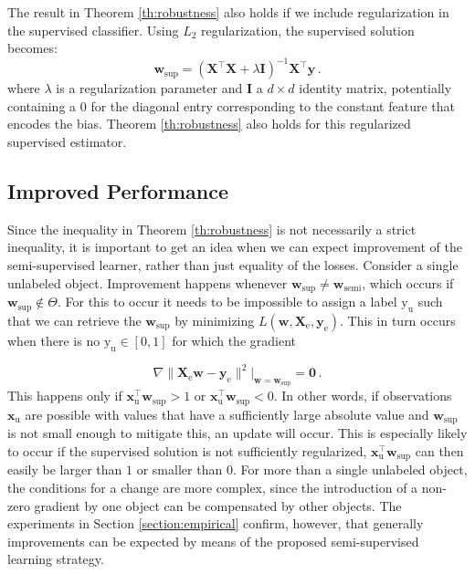 \documentclass[twoside]{memoir}\usepackage[]{graphicx}\usepackage{xcolor}
\renewcommand{\vec}{\mathbf}
\begin{document}
The result in Theorem \ref{th:robustness} also holds if we include regularization in the supervised classifier. Using $L_2$ regularization, the supervised solution becomes:
\begin{equation}
\label{eq:regsupervisedsolution}
\vec{w}_{\text{sup}} = (\vec{X}^\top \vec{X} + \lambda \vec{I})^{-1} \vec{X}^\top \vec{y}\,. \nonumber
\end{equation}
where $\lambda$ is a regularization parameter and $\vec{I}$ a $d \times d$ identity matrix, potentially containing a $0$ for the diagonal entry corresponding to the constant feature that encodes the bias. Theorem \ref{th:robustness} also holds for this regularized supervised estimator.

\subsection{Improved Performance}
Since the inequality in Theorem \ref{th:robustness} is not necessarily a strict inequality, it is important to get an idea when we can expect improvement of the semi-supervised learner, rather than just equality of the losses. Consider a single unlabeled object. Improvement happens whenever $\vec{w}_\text{sup} \neq \vec{w}_\text{semi}$, which occurs if $\vec{w}_\text{sup} \notin \Theta$.  For this to occur it needs to be impossible to assign a label $\text{y}_\text{u}$ such that we can retrieve the $\vec{w}_\text{sup}$ by minimizing $L(\vec{w},\vec{X}_\text{e},\vec{y}_\text{e})$. This in turn occurs when there is no $\text{y}_\text{u} \in [0,1]$ for which the gradient

\begin{equation}
\nabla \lVert \vec{X}_\text{e} \vec{w} - \vec{y}_\text{e} \rVert^2\bigg|_{\vec{w}=\vec{w}_\text{sup}}=\vec{0}  \, . \nonumber
\end{equation}
This happens only if $\vec{x}_\text{u}^\top \vec{w}_\text{sup} > 1$ or $\vec{x}_\text{u}^\top \vec{w}_\text{sup} < 0$. In other words, if observations $\vec{x}_\text{u}$ are possible with values that have a sufficiently large absolute value and $\vec{w}_\text{sup}$ is not small enough to mitigate this, an update will occur. This is especially likely to occur if the supervised solution is not sufficiently regularized, $\vec{x}_\text{u}^\top \vec{w}_\text{sup}$ can then easily be larger than $1$ or smaller than $0$. For more than a single unlabeled object, the conditions for a change are more complex, since the introduction of a non-zero gradient by one object can be compensated by other objects. The experiments in Section \ref{section:empirical} confirm, however, that generally improvements can be expected by means of the proposed semi-supervised learning strategy.
\end{document}
